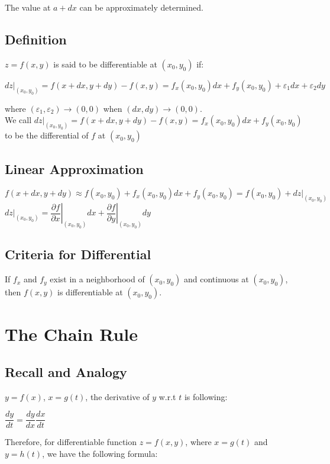 \documentclass[UTF8,a4paper, 10pt, openany]{svmono}
\begin{document}
The value at $a+dx$ can be approximately determined.
\subsection{Definition}
$z=f(x,y)$ is said to be differentiable at $(x_0,y_0)$ if:

\begin{center}
$dz|_{(x_0,y_0)}=f(x+dx,y+dy)-f(x,y)=f_x(x_0,y_0)dx+f_y(x_0,y_0)+\varepsilon_1dx+\varepsilon_2dy$
\end{center}

where $(\varepsilon_1,\varepsilon_2)\to (0,0)$ when $(dx,dy)\to (0,0)$.\\

We call $dz|_{(x_0,y_0)}=f(x+dx,y+dy)-f(x,y)=f_x(x_0,y_0)dx+f_y(x_0,y_0)$ to be the differential of $f$ at $(x_0,y_0)$
\subsection{Linear Approximation}
\begin{center}
$f(x+dx,y+dy)\approx f(x_0,y_0)+f_x(x_0,y_0)dx+f_y(x_0,y_0)=f(x_0,y_0)+dz|_{(x_0,y_0)}$\\
$dz|_{(x_0,y_0)}=\left. \dfrac{\partial f}{\partial x} \right|_{(x_0,y_0)}dx + 	\left.\dfrac{\partial f}{\partial y} \right|_{(x_0,y_0)}dy$
\end{center}
\subsection{Criteria for Differential}
If $f_x$ and $f_y$ exist in a neighborhood of $(x_0,y_0)$ and continuous at $(x_0,y_0)$, then $f(x,y)$ is differentiable at $(x_0,y_0)$.

\section{The Chain Rule}
\subsection{Recall and Analogy}
$y=f(x)$, $x=g(t)$, the derivative of $y$ w.r.t $t$ is following:

\begin{center}
$\dfrac{dy}{dt}=\dfrac{dy}{dx}\dfrac{dx}{dt}$
\end{center}

Therefore, for differentiable function $z=f(x,y)$, where $x=g(t)$ and $y=h(t)$, we have the following formula:
\end{document}
